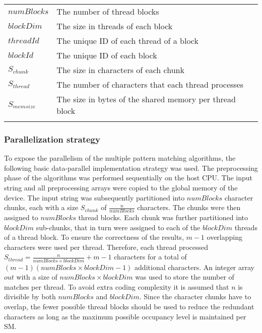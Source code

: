 \documentclass{ws-ijait}
\begin{document}
\begin{table}
{\begin{tabular}{@{}ll@{}} \toprule
$numBlocks$ & The number of thread blocks \\
$blockDim$ & The size in threads of each block \\
$threadId$ & The unique ID of each thread of a block \\
$blockId$ & The unique ID of each block\\
$S_{chunk}$ & The size in characters of each chunk\\
$S_{thread}$ & The number of characters that each thread processes\\
$S_{memsize}$ & The size in bytes of the shared memory per thread block\\ \botrule
\end{tabular}}
\label{tab:cuda_multi_notation}
\end{table}


\subsubsection{Parallelization strategy}
\label{sec:parallelizationstrategy}

To expose the parallelism of the multiple pattern matching algorithms, the following basic data-parallel implementation strategy was used. The preprocessing phase of the algorithms was performed sequentially on the host CPU. The input string and all preprocessing arrays were copied to the global memory of the device. The input string was subsequently partitioned into $numBlocks$ character chunks, each with a size $S_{chunk}$ of $\frac{n}{numBlocks}$ characters. The chunks were then assigned to $numBlocks$ thread blocks. Each chunk was further partitioned into $blockDim$ sub-chunks, that in turn were assigned to each of the $blockDim$ threads of a thread block. To ensure the correctness of the results, $m - 1$ overlapping characters were used per thread. Therefore, each thread processed $S_{thread} = \frac{n}{numBlocks \times blockDim} + m - 1$ characters for a total of $(m - 1) ( numBlocks \times blockDim - 1 )$ additional characters. An integer array $out$ with a size of $numBlocks \times blockDim$ was used to store the number of matches per thread. To avoid extra coding complexity it is assumed that $n$ is divisible by both $numBlocks$ and $blockDim$. Since the character chunks have to overlap, the fewer possible thread blocks should be used to reduce the redundant characters as long as the maximum possible occupancy level is maintained per SM. 
\end{document}
